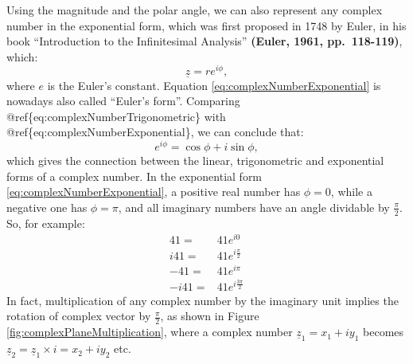 \documentclass[
]{book}
\begin{document}
Using the magnitude and the polar angle, we can also represent any complex number in the exponential form, which was first proposed in 1748 by Euler, in his book ``Introduction to the Infinitesimal Analysis'' \textbf{(Euler, 1961, pp.~118-119)}, which:
\begin{equation}
    \underline{z} = r e^{i \phi} ,
    \label{eq:complexNumberExponential}
\end{equation}
where \(e\) is the Euler's constant. Equation \eqref{eq:complexNumberExponential} is nowadays also called ``Euler's form''. Comparing @ref\{eq:complexNumberTrigonometric\} with @ref\{eq:complexNumberExponential\}, we can conclude that:
\begin{equation}
    e^{i \phi} = \cos \phi + i \sin \phi ,
    \label{eq:EulerFormula}
\end{equation}
which gives the connection between the linear, trigonometric and exponential forms of a complex number. In the exponential form \eqref{eq:complexNumberExponential}, a positive real number has \(\phi=0\), while a negative one has \(\phi=\pi\), and all imaginary numbers have an angle dividable by \(\frac{\pi}{2}\). So, for example:
\begin{equation*}
    \begin{aligned}
    41 = & 41 e^{i 0} \\
    i41 = & 41 e^{i \frac{\pi}{2}} \\
    -41 = & 41 e^{i \pi} \\
    -i41 = & 41 e^{i \frac{3 \pi}{2}}
    \end{aligned}
\end{equation*}
In fact, multiplication of any complex number by the imaginary unit implies the rotation of complex vector by \(\frac{\pi}{2}\), as shown in Figure \ref{fig:complexPlaneMultiplication}, where a complex number \(\underline{z}_1 = x_1 + i y_1\) becomes \(\underline{z}_2 = \underline{z}_1 \times i = x_2 + i y_2\) etc.
\end{document}
